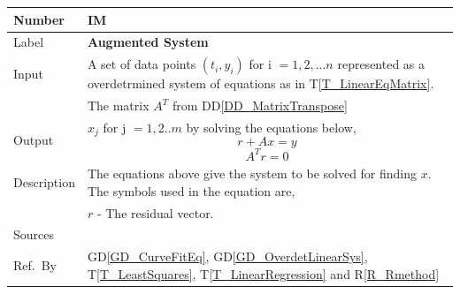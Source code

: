 \documentclass[12pt]{article}
\newcommand{\colAwidth}{0.13\textwidth}
\newcommand{\colBwidth}{0.82\textwidth}
\newcommand{\dref}[1]{GD\ref{#1}}
\newcommand{\ddref}[1]{DD\ref{#1}}
\newcommand{\tref}[1]{T\ref{#1}}
\newcounter{instnum} %
\newcommand{\rref}[1]{R\ref{#1}}
\begin{document}
\noindent
\begin{minipage}{\textwidth}
	\renewcommand*{\arraystretch}{1.5}
	\begin{tabular}{| p{\colAwidth} | p{\colBwidth}|}
		\hline
		\rowcolor[gray]{0.9}
		Number& IM{instnum}\theinstnum \label{IM_AugmentedSystem}\\
		\hline
		Label& \bf Augmented System\\
		\hline
		
		Input
		& A set of data points $(t_i,y_i)$ for i $=1,2,...n$ represented as a overdetrmined system of equations as in \tref{T_LinearEqMatrix}.\\
		& The matrix $A^{T}$ from \ddref{DD_MatrixTranspose}\\
		\hline
		
		Output
		& $x_j$ for j $=1,2..m$ by solving the equations below,
		\begin{equation*}
		r + Ax = y
		\end{equation*}
		\begin{equation*}
		A^{T} r = 0
		\end{equation*}\\
		\hline
		Description & The equations above give the system to be solved for finding $x$. The symbols used in the equation are,\\
		& $r$ - The residual vector.\\
		\hline
		Sources& ~\cite{Health1997}\\
		\hline
		
		Ref.\ By & \dref{GD_CurveFitEq}, \dref{GD_OverdetLinearSys}, \tref{T_LeastSquares}, \tref{T_LinearRegression} and \rref{R_Rmethod}\\
		\hline
	\end{tabular}
\end{minipage}\\



~\newline
\end{document}
